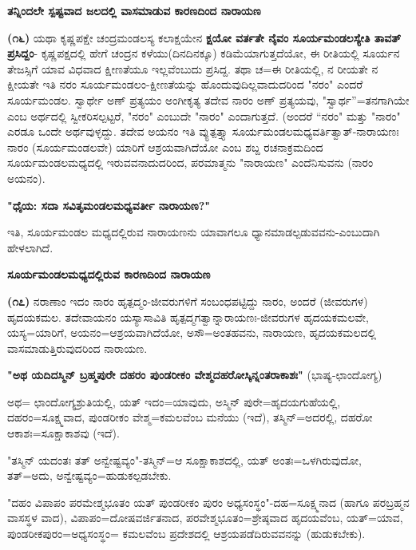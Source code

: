 \begin{center}
\textbf{ತನ್ನಿಂದಲೇ ಸ್ಪಷ್ಟವಾದ ಜಲದಲ್ಲಿ ವಾಸಮಾಡುವ ಕಾರಣದಿಂದ ನಾರಾಯಣ}
\end{center}

\textbf{(೧೬)} ಯಥಾ ಕೃಷ್ಣಪಕ್ಷೇ ಚಂದ್ರಮಂಡಲಸ್ಯ ಕಲಾಕ್ಷಯೇನ \textbf{ಕ್ಷಯೋ ವರ್ತತೇ ನೈವಂ ಸೂರ್ಯಮಂಡಲಸ್ಯೇತಿ ತಾವತ್ ಪ್ರಸಿದ್ದಂ}- ಕೃಷ್ಣಪಕ್ಷದಲ್ಲಿ ಹೇಗೆ ಚಂದ್ರನ ಕಳೆಯು\break (ದಿನದಿನಕ್ಕೂ) ಕಡಿಮೆಯಾಗುತ್ತದೆಯೋ, ಈ ರೀತಿಯಲ್ಲಿ ಸೂರ್ಯನ ತೇಜಸ್ಸಿಗೆ ಯಾವ ವಿಧವಾದ ಕ್ಷೀಣತೆಯೂ ಇಲ್ಲವೆಂಬುದು ಪ್ರಸಿದ್ದ. ತಥಾ ಚ=ಈ ರೀತಿಯಲ್ಲಿ, ನ ರೀಯತೇ ನ ಕ್ಷೀಯತೇ ಇತಿ ನರಂ ಸೂರ್ಯಮಂಡಲಂ-ಕ್ಷೀಣತೆಯನ್ನು ಹೊಂದುವುದಿಲ್ಲವಾದುದರಿಂದ "ನರಂ" ಎಂದರೆ ಸೂರ್ಯಮಂಡಲ. ಸ್ವಾರ್ಥೇ ಅಣ್ ಪ್ರತ್ಯಯಂ ಅಂಗೀಕೃತ್ಯ ತದೇವ ನಾರಂ ಅಣ್ ಪ್ರತ್ಯಯವು, "ಸ್ವಾರ್ಥ''=ತನಗಾಗಿಯೇ ಎಂಬ ಅರ್ಥದಲ್ಲಿ ಸ್ವೀಕರಿಸಲ್ಪಟ್ಟರೆ, "ನರಂ" ಎಂಬುದೇ "ನಾರಂ" ಎಂದಾಗುತ್ತದೆ. (ಅಂದರೆ “ನರಂ" ಮತ್ತು "ನಾರಂ" ಎರಡೂ ಒಂದೇ ಅರ್ಥವುಳ್ಳದ್ದು. ತದೇವ ಅಯನಂ ಇತಿ ವ್ಯುತ್ಪತ್ತ್ಯಾ ಸೂರ್ಯಮಂಡಲಮಧ್ಯವರ್ತಿತ್ವಾತ್-ನಾರಾಯಣಃ ನಾರಂ (ಸೂರ್ಯಮಂಡಲವೇ) ಯಾರಿಗೆ ಆಶ್ರಯವಾಗಿದೆಯೋ ಎಂಬ ಶಬ್ದ ರಚನಾಕ್ರಮದಿಂದ ಸೂರ್ಯಮಂಡಲಮಧ್ಯದಲ್ಲಿ ಇರುವವನಾದುದರಿಂದ, ಪರಮಾತ್ಮನು "ನಾರಾಯಣ" ಎಂದೆನಿಸುವನು (ನಾರಂ ಅಯನಂ).

\begin{center}
\textbf{"ಧೈಯ: ಸದಾ ಸವಿತೃಮಂಡಲಮಧ್ಯವರ್ತೀ ನಾರಾಯಣ?"}
\end{center}

\noindent
ಇತಿ, ಸೂರ್ಯಮಂಡಲ ಮಧ್ಯದಲ್ಲಿರುವ ನಾರಾಯಣನು ಯಾವಾಗಲೂ ಧ್ಯಾನಮಾಡಲ್ಪಡುವವನು-ಎಂಬುದಾಗಿ ಹೇಳಲಾಗಿದೆ.

\begin{center}
\textbf{ಸೂರ್ಯಮಂಡಲಮಧ್ಯದಲ್ಲಿರುವ ಕಾರಣದಿಂದ ನಾರಾಯಣ}
\end{center}

\textbf{(೧೭)} ನರಾಣಾಂ ಇದಂ ನಾರಂ ಹೃತ್ಪದ್ಮಂ-ಜೀವರುಗಳಿಗೆ ಸಂಬಂಧಪಟ್ಟಿದ್ದು ನಾರಂ, ಅಂದರೆ (ಜೀವರುಗಳ) ಹೃದಯಕಮಲ. ತದೇವಾಯನಂ ಯಸ್ಯಾಸಾವಿತಿ ಹೃತ್ಪದ್ಮಗತ್ವಾನ್ನಾರಾಯಣಃ-ಜೀವರುಗಳ ಹೃದಯಕಮಲವೇ, ಯಸ್ಯ=ಯಾರಿಗೆ, ಅಯನಂ=ಆಶ್ರಯವಾಗಿ\-ದೆಯೋ, ಅಸೌ=ಅಂತಹವನು, ನಾರಾಯಣ, ಹೃದಯಕಮಲದಲ್ಲಿ ವಾಸಮಾಡುತ್ತಿರುವುದರಿಂದ ನಾರಾಯಣ.

\textbf{"ಅಥ ಯದಿದಸ್ಮಿನ್ ಬ್ರಹ್ಮಪುರೇ ದಹರಂ ಪುಂಡರೀಕಂ ವೇಶ್ಮದಹರೋಸ್ಕಿನ್ನಂತರಾಕಾಶಃ"} (ಭಾಷ್ಯ-ಛಾಂದೋಗ್ಯ)

ಅಥ= ಛಾಂದೋಗ್ಯಶ್ರುತಿಯಲ್ಲಿ, ಯತ್ ಇದಂ=ಯಾವುದು, ಅಸ್ಮಿನ್ ಪುರೇ=ಹೃದಯ\-ಗುಹೆಯಲ್ಲಿ, ದಹರಂ=ಸೂಕ್ಷ್ಮವಾದ, ಪುಂಡರೀಕಂ ವೇಶ್ಮ=ಕಮಲವೆಂಬ ಮನೆಯು (ಇದೆ), ತಸ್ಮಿನ್=ಅದರಲ್ಲಿ, ದಹರೋ ಆಕಾಶಃ=ಸೂಕ್ಷಾಕಾಶವು (ಇದೆ).

"ತಸ್ಮಿನ್ ಯದಂತಃ ತತ್ ಅನ್ವೇಷ್ಟವ್ಯಂ"-ತಸ್ಮಿನ್=ಆ ಸೂಕ್ಷಾಕಾಶದಲ್ಲಿ, ಯತ್ ಅಂತಃ=ಒಳಗಿರುವುದೋ, ತತ್=ಅದು, ಅನ್ವೇಷ್ಟವ್ಯಂ=ಹುಡುಕಲ್ಪಡಬೇಕು.

\newpage

"ದಹಂ ವಿಪಾಪಂ ಪರಮೇಶ್ಮಭೂತಂ ಯತ್ ಪುಂಡರೀಕಂ ಪುರಂ ಅಧ್ಯಸಂಸ್ಥಂ"-ದಹ=\-ಸೂಕ್ಷ್ಮನಾದ (ಹಾಗೂ ಪರಬ್ರಹ್ಮನ ವಾಸಸ್ಥಳ ವಾದ), ವಿಪಾಪಂ=ದೋಷವರ್ಜಿತನಾದ, ಪರವೇಶ್ಮಭೂತಂ=ಶ್ರೇಷ್ಠವಾದ ಹೃದಯವೆಂಬ, ಯತ್=ಯಾವ, ಪುಂಡರೀಕಪುರಂ=ಅಧ್ಯಸಂಸ್ಥಂ\-= ಕಮಲವೆಂಬ ಪ್ರದೇಶದಲ್ಲಿ ಆಶ್ರಯಪಡೆದಿರುವವನನ್ನು (ಹುಡುಕಬೇಕು).


